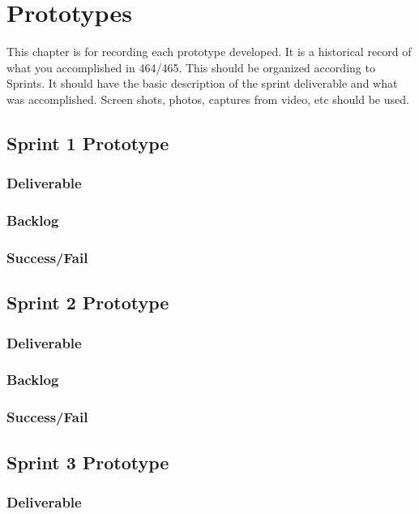 

\chapter{Prototypes}

This chapter is for recording each prototype developed.  It is a historical record of what you accomplished in 464/465.   This should be organized according to Sprints.  It should have the basic description of the sprint deliverable and what was accomplished.  Screen shots, photos, captures from video, etc should be used.  

\section{Sprint 1 Prototype}
\subsection{Deliverable}
\subsection{Backlog}
\subsection{Success/Fail}

\section{Sprint 2 Prototype}
\subsection{Deliverable}
\subsection{Backlog}
\subsection{Success/Fail}

\section{Sprint 3 Prototype}
\subsection{Deliverable}
